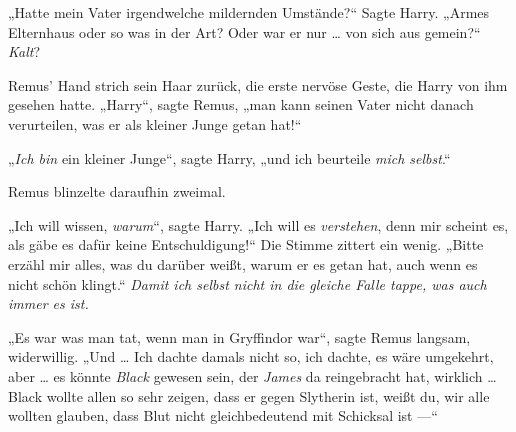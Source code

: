 „Hatte mein Vater irgendwelche mildernden Umstände?“ Sagte Harry.
„Armes Elternhaus oder so was in der Art? Oder war er nur … von sich aus gemein?“ \emph{Kalt}?

Remus’ Hand strich sein Haar zurück, die erste nervöse Geste, die Harry von ihm gesehen hatte.
„Harry“, sagte Remus, „man kann seinen Vater nicht danach verurteilen, was er als kleiner Junge getan hat!“

„\emph{Ich bin} ein kleiner Junge“, sagte Harry, „und ich beurteile \emph{mich selbst}.“

Remus blinzelte daraufhin zweimal.

„Ich will wissen, \emph{warum}“, sagte Harry.
„Ich will es \emph{verstehen}, denn mir scheint es, als gäbe es dafür keine Entschuldigung!“ Die Stimme zittert ein wenig.
„Bitte erzähl mir alles, was du darüber weißt, warum er es getan hat, auch wenn es nicht schön klingt.“ \emph{Damit ich selbst nicht in die gleiche Falle tappe, was auch immer es ist.}

„Es war was man tat, wenn man in Gryffindor war“, sagte Remus langsam, widerwillig.
„Und … Ich dachte damals nicht so, ich dachte, es wäre umgekehrt, aber … es könnte \emph{Black} gewesen sein, der \emph{James} da reingebracht hat, wirklich … Black wollte allen so sehr zeigen, dass er gegen Slytherin ist, weißt du, wir alle wollten glauben, dass Blut nicht gleichbedeutend mit Schicksal ist —“

\later

